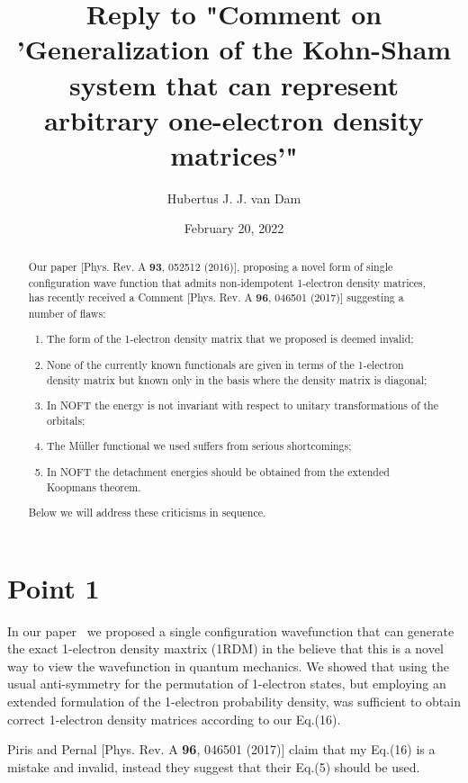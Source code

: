 \documentclass[pra]{revtex4-1}
\begin{document}
\title{Reply to "Comment on 'Generalization of the Kohn-Sham system that can
       represent arbitrary one-electron density matrices'"}
\author{Hubertus J. J. van Dam}
\date{February 20, 2022}

\begin{abstract}
Our paper [Phys. Rev. A {\bf 93}, 052512 (2016)], proposing a novel form of
single configuration wave function that admits non-idempotent 1-electron
density matrices, has recently received a Comment [Phys. Rev. A {\bf 96},
046501 (2017)] suggesting a number of flaws:
\begin{enumerate}
\item The form of the 1-electron density matrix that we proposed is deemed
      invalid;
\item None of the currently known functionals are given in terms of the
      1-electron density matrix but known only in the basis where the
      density matrix is diagonal;
\item In NOFT the energy is not invariant with respect to unitary
      transformations of the orbitals;
\item The M{\"u}ller functional we used suffers from serious shortcomings;
\item In NOFT the detachment energies should be obtained from the extended
      Koopmans theorem.
\end{enumerate}
Below we will address these criticisms in sequence.
\end{abstract}

\maketitle

\section{Point 1}

In our paper~\cite{vanDam:2016} we proposed a single configuration wavefunction
that can generate the exact 1-electron density maxtrix (1RDM) in the believe
that this is a novel way to view the wavefunction in quantum mechanics.
We showed that using the usual anti-symmetry for the permutation of 1-electron
states, but employing an extended formulation of the 1-electron probability
density, was sufficient to obtain correct 1-electron density matrices
according to our Eq.(16). 

Piris and Pernal [Phys. Rev. A {\bf 96}, 046501 (2017)] claim that my Eq.(16) is
a mistake and invalid, instead they suggest that their Eq.(5) should be used.
\end{document}
